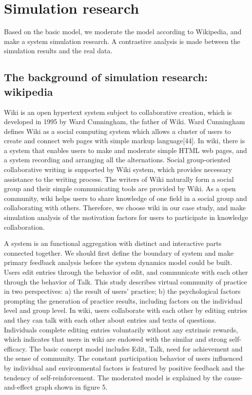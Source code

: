 \documentclass{elsarticle}
\begin{document}
\section{Simulation research }
\label{sec:simulation-research-}

 Based on the basic model, we moderate the model according to
    Wikipedia, and make a system simulation research. A contrastive
    analysis is made between the simulation results and the real
    data. 

\subsection{The background of simulation research: wikipedia}
\label{sec:backgr-simul-rese}

Wiki is an open hypertext system subject to collaborative creation, which is developed in 1995 by Ward Cunningham, the father of Wiki. Ward Cunningham defines Wiki as a social computing system which allows a cluster of users to create and connect web pages with simple markup language[44]. In wiki, there is a system that enables users to make and moderate simple HTML web pages, and a system recording and arranging all the alternations. Social group-oriented collaborative writing is supported by Wiki system, which provides necessary assistance to the writing process. The writers of Wiki naturally form a social group and their simple communicating tools are provided by Wiki. As a open community, wiki helps users to share knowledge of one field in a social group and collaborating with others. Therefore, we choose wiki in our case study, and make simulation analysis of the motivation factors for users to participate in knowledge collaboration. 

   

A system is an functional aggregation with distinct and interactive parts connected together. We should first define the boundary of system and make primary feedback analysis before the system dynamics model could be built. Users edit entries through the behavior of edit, and communicate with each other through the behavior of Talk. This study describes virtual community of practice in two perspectives: a) the result of users’ practice; b) the psychological factors prompting the generation of practice results, including factors on the individual level and group level. In wiki, users collaborate with each other by editing entries and they can talk with each other about entries and texts of questions. Individuals complete editing entries voluntarily without any extrinsic rewards, which indicates that users in wiki are endowed with the similar and strong self-efficacy. The basic concept model includes Edit, Talk, need for achievement and the sense of community. The constant participation behavior of users influenced by individual and environmental factors is featured by positive feedback and the tendency of self-reinforcement. The moderated model is explained by the cause-and-effect graph shown in figure 5. 
\end{document}
